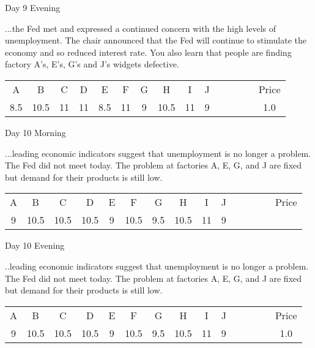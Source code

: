\documentclass[notes=show]{beamer}
\begin{document}
\begin{frame}{Day 9 Evening}

\qquad ...the Fed met and expressed a continued concern
with the high levels of unemployment. The chair announced that the Fed will
continue to stimulate the economy and so reduced interest rate. You also
learn that people are finding factory A's, E's, G's and J's widgets
defective.

\bigskip

\begin{center}
\begin{tabular}{ccccccccccccccc}
A & B & C & D & E & F & G & H & I & J &  &  &  &  & Price \\ 
8.5 & 10.5 & 11 & 11 & 8.5 & 11 & 9 & 10.5 & 11 & 9 &  &  &  &  & 1.0%
\end{tabular}
\end{center}
\end{frame}

\begin{frame}{Day 10 Morning}

\qquad ...leading economic indicators suggest that
unemployment is no longer a problem. The Fed did not meet today. The problem
at factories A, E, G, and J are fixed but demand for their products is still
low.

\bigskip

\begin{center}
\begin{tabular}{ccccccccccccccc}
A & B & C & D & E & F & G & H & I & J &  &  &  &  & Price \\ 
9 & 10.5 & 10.5 & 10.5 & 9 & 10.5 & 9.5 & 10.5 & 11 & 9 &  &  &  &  & 
\end{tabular}
\end{center}
\end{frame}

\begin{frame}{Day 10 Evening}

\qquad ..leading economic indicators suggest that
unemployment is no longer a problem. The Fed did not meet today. The problem
at factories A, E, G, and J are fixed but demand for their products is still
low.

\bigskip

\begin{center}
\begin{tabular}{ccccccccccccccc}
A & B & C & D & E & F & G & H & I & J &  &  &  &  & Price \\ 
9 & 10.5 & 10.5 & 10.5 & 9 & 10.5 & 9.5 & 10.5 & 11 & 9 &  &  &  &  & 1.0%
\end{tabular}
\end{center}
\end{frame}
\end{document}
